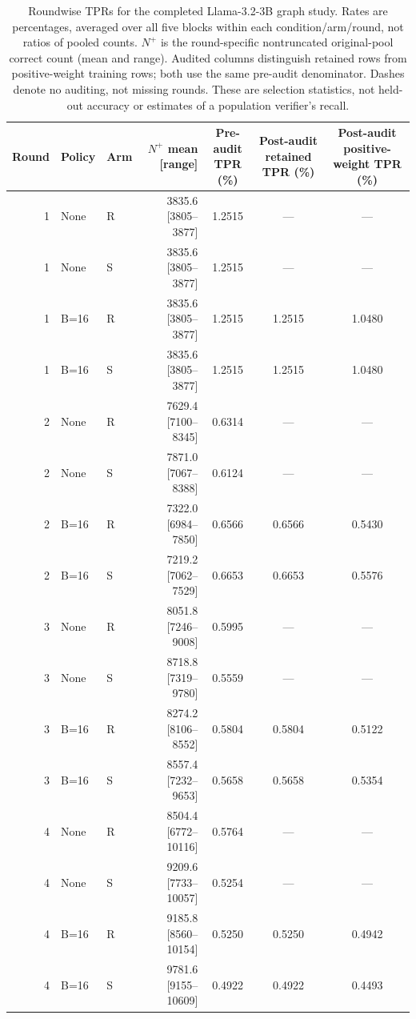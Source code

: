 \begin{table}[H]
\caption{Roundwise TPRs for the completed Llama-3.2-3B graph study. Rates are percentages, averaged over all five blocks within each condition/arm/round, not ratios of pooled counts. $N^+$ is the round-specific nontruncated original-pool correct count (mean and range). Audited columns distinguish retained rows from positive-weight training rows; both use the same pre-audit denominator. Dashes denote no auditing, not missing rounds. These are selection statistics, not held-out accuracy or estimates of a population verifier's recall.}
\label{tab:h100-tpr}
\centering\small\setlength{\tabcolsep}{5pt}
\begin{tabular}{@{}rllrccc@{}}
\toprule
Round & Policy & Arm & $N^+$ mean [range] & \shortstack{Pre-audit\\TPR (\%)} & \shortstack{Post-audit\\retained TPR (\%)} & \shortstack{Post-audit\\positive-weight TPR (\%)}\\
\midrule
1 & None & R & 3835.6 [3805--3877] & 1.2515 & --- & ---\\
1 & None & S & 3835.6 [3805--3877] & 1.2515 & --- & ---\\
1 & B=16 & R & 3835.6 [3805--3877] & 1.2515 & 1.2515 & 1.0480\\
1 & B=16 & S & 3835.6 [3805--3877] & 1.2515 & 1.2515 & 1.0480\\
2 & None & R & 7629.4 [7100--8345] & 0.6314 & --- & ---\\
2 & None & S & 7871.0 [7067--8388] & 0.6124 & --- & ---\\
2 & B=16 & R & 7322.0 [6984--7850] & 0.6566 & 0.6566 & 0.5430\\
2 & B=16 & S & 7219.2 [7062--7529] & 0.6653 & 0.6653 & 0.5576\\
3 & None & R & 8051.8 [7246--9008] & 0.5995 & --- & ---\\
3 & None & S & 8718.8 [7319--9780] & 0.5559 & --- & ---\\
3 & B=16 & R & 8274.2 [8106--8552] & 0.5804 & 0.5804 & 0.5122\\
3 & B=16 & S & 8557.4 [7232--9653] & 0.5658 & 0.5658 & 0.5354\\
4 & None & R & 8504.4 [6772--10116] & 0.5764 & --- & ---\\
4 & None & S & 9209.6 [7733--10057] & 0.5254 & --- & ---\\
4 & B=16 & R & 9185.8 [8560--10154] & 0.5250 & 0.5250 & 0.4942\\
4 & B=16 & S & 9781.6 [9155--10609] & 0.4922 & 0.4922 & 0.4493\\
\bottomrule
\end{tabular}
\end{table}
